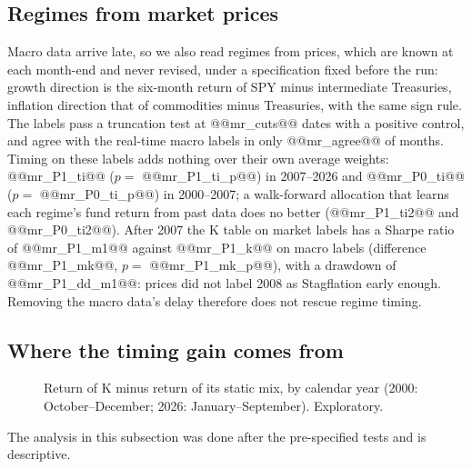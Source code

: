 \documentclass[11pt,a4paper]{article}
\begin{document}
\subsection{Regimes from market prices}
\label{sec:market}

Macro data arrive late, so we also read regimes from prices, which are known at each month-end and never
revised, under a specification fixed before the run: growth direction is the six-month return of SPY minus
intermediate Treasuries, inflation direction that of commodities minus Treasuries, with the same sign rule.
The labels pass a truncation test at @@mr_cuts@@ dates with a positive control, and agree with the real-time macro
labels in only @@mr_agree@@ of months. Timing on these labels adds nothing over their own average weights:
@@mr_P1_ti@@ ($p=$ @@mr_P1_ti_p@@) in 2007--2026 and @@mr_P0_ti@@ ($p=$ @@mr_P0_ti_p@@) in 2000--2007; a walk-forward
allocation that learns each regime's fund return from past data does no better (@@mr_P1_ti2@@ and @@mr_P0_ti2@@).
After 2007 the K table on market labels has a Sharpe ratio of @@mr_P1_m1@@ against @@mr_P1_k@@ on macro labels
(difference @@mr_P1_mk@@, $p=$ @@mr_P1_mk_p@@), with a drawdown of @@mr_P1_dd_m1@@: prices did not label 2008 as
Stagflation early enough. Removing the macro data's delay therefore does not rescue regime timing.

\subsection{Where the timing gain comes from}
\label{sec:where}

\begin{figure}[htbp]
\centering
{}
\caption{Return of K minus return of its static mix, by calendar year (2000: October--December; 2026:
January--September). Exploratory.}
\label{fig:year}
\end{figure}

The analysis in this subsection was done after the pre-specified tests and is descriptive.
\end{document}
